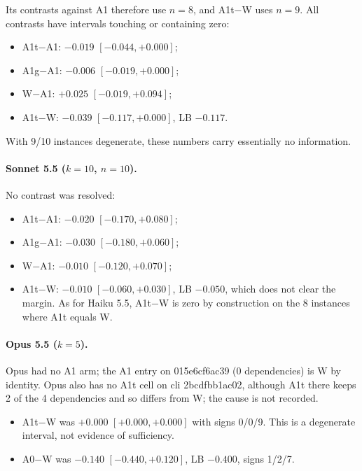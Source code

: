 Its contrasts against A1 therefore use $n=8$, and A1t$-$W uses $n=9$. All contrasts have intervals touching or containing zero:
\begin{itemize}
\item A1t$-$A1: $-0.019$ $[-0.044, +0.000]$;
\item A1g$-$A1: $-0.006$ $[-0.019, +0.000]$;
\item W$-$A1: $+0.025$ $[-0.019, +0.094]$;
\item A1t$-$W: $-0.039$ $[-0.117, +0.000]$, LB $-0.117$.
\end{itemize}
With 9/10 instances degenerate, these numbers carry essentially no information.

\paragraph{Sonnet 5.5 ($k=10$, $n=10$).} No contrast was resolved:
\begin{itemize}
\item A1t$-$A1: $-0.020$ $[-0.170, +0.080]$;
\item A1g$-$A1: $-0.030$ $[-0.180, +0.060]$;
\item W$-$A1: $-0.010$ $[-0.120, +0.070]$;
\item A1t$-$W: $-0.010$ $[-0.060, +0.030]$, LB $-0.050$, which does not clear the margin. As for Haiku 5.5, A1t$-$W is zero by construction on the 8 instances where A1t equals W.
\end{itemize}

\paragraph{Opus 5.5 ($k=5$).} Opus had no A1 arm; the A1 entry on 015e6cf6ac39 (0 dependencies) is W by identity. Opus also has no A1t cell on cli 2bcdfbb1ac02, although A1t there keeps 2 of the 4 dependencies and so differs from W; the cause is not recorded.
\begin{itemize}
\item A1t$-$W was $+0.000$ $[+0.000, +0.000]$ with signs 0/0/9. This is a degenerate interval, not evidence of sufficiency.
\item A0$-$W was $-0.140$ $[-0.440, +0.120]$, LB $-0.400$, signs 1/2/7.
\end{itemize}

